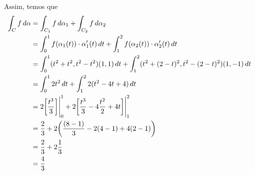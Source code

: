 \documentclass[../main.tex]{subfiles}
\begin{document}
\begin{solucao}
\begin{enumerate}
			Assim, temos que
			\begin{align*}
				\int_C f\, d\alpha
				&=\int_{C_1} f\, d\alpha_1+\int_{C_2} f\, d\alpha_2\\
				&=\int_{0}^1 f(\alpha_1(t))\cdot \alpha_1'(t)\, dt+\int_{1}^2 f(\alpha_2(t))\cdot \alpha_2'(t)\, dt\\
				&=\int_{0}^1 (t^2+t^2, t^2-t^2)(1,1)\, dt+\int_{1}^2 (t^2+(2-t)^2, t^2-(2-t)^2)(1,-1)\, dt\\
				&=\int_{0}^1 2t^2\, dt + \int_{1}^2 2(t^2-4t+4)\, dt \\
				&=2\bigg[\frac{t^3}{3}\bigg]\Biggr{|}_{0}^1+2\bigg[\frac{t^3}{3}-4\frac{t^2}{2}+4t\bigg]\Biggr{|}_{1}^2\\				&=\frac{2}{3}+2\bigg(\frac{(8-1)}{3}-2(4-1)+4(2-1)\bigg)\\
				&=\frac{2}{3}+2\frac{1}{3}\\
				&=\frac{4}{3}
			\end{align*}
			

\end{enumerate}
\end{solucao}
\end{document}
